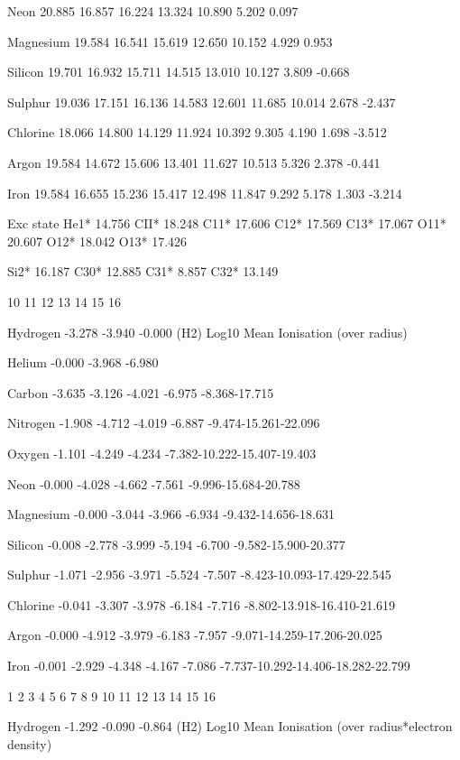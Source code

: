 { Neon       20.885 16.857 16.224 13.324 10.890  5.202  0.097

 Magnesium  19.584 16.541 15.619 12.650 10.152  4.929  0.953

 Silicon    19.701 16.932 15.711 14.515 13.010 10.127  3.809 -0.668

 Sulphur    19.036 17.151 16.136 14.583 12.601 11.685 10.014  2.678 -2.437

 Chlorine   18.066 14.800 14.129 11.924 10.392  9.305  4.190  1.698 -3.512

 Argon      19.584 14.672 15.606 13.401 11.627 10.513  5.326  2.378 -0.441

 Iron       19.584 16.655 15.236 15.417 12.498 11.847  9.292  5.178  1.303
-3.214

 Exc state    He1* 14.756   CII* 18.248   C11* 17.606   C12* 17.569   C13*
17.067   O11* 20.607   O12* 18.042   O13* 17.426

              Si2* 16.187   C30* 12.885   C31*  8.857   C32* 13.149

10     11     12     13     14     15     16    

 Hydrogen   -3.278 -3.940 -0.000 (H2)                 Log10 Mean Ionisation
(over radius)

 Helium     -0.000 -3.968 -6.980

 Carbon     -3.635 -3.126 -4.021 -6.975 -8.368-17.715

 Nitrogen   -1.908 -4.712 -4.019 -6.887 -9.474-15.261-22.096

 Oxygen     -1.101 -4.249 -4.234 -7.382-10.222-15.407-19.403

 Neon       -0.000 -4.028 -4.662 -7.561 -9.996-15.684-20.788

 Magnesium  -0.000 -3.044 -3.966 -6.934 -9.432-14.656-18.631

 Silicon    -0.008 -2.778 -3.999 -5.194 -6.700 -9.582-15.900-20.377

 Sulphur    -1.071 -2.956 -3.971 -5.524 -7.507 -8.423-10.093-17.429-22.545

 Chlorine   -0.041 -3.307 -3.978 -6.184 -7.716 -8.802-13.918-16.410-21.619

 Argon      -0.000 -4.912 -3.979 -6.183 -7.957 -9.071-14.259-17.206-20.025

 Iron       -0.001 -2.929 -4.348 -4.167 -7.086
-7.737-10.292-14.406-18.282-22.799

               1      2      3      4      5      6      7      8      9
10     11     12     13     14     15     16    

 Hydrogen   -1.292 -0.090 -0.864 (H2)         Log10 Mean Ionisation (over
radius*electron density)

}
